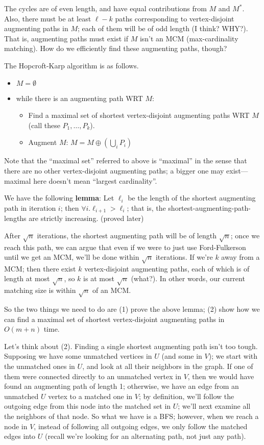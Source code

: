 \documentclass{article}
\newcommand{\bitem}{\begin{itemize}}
\newcommand{\eitem}{\end{itemize}}
\begin{document}
The cycles are of even length, and have equal contributions from $M$ and $M^*$.
Also, there must be at least $\ell-k$ paths corresponding to vertex-disjoint
augmenting paths in $M$; each of them will be of odd length (I think? WHY?).
That is, augmenting paths must exist if $M$ isn't an MCM (max-cardinality 
matching).
How do we efficiently find these augmenting paths, though? 

The Hopcroft-Karp algorithm is as follows.
\bitem
	\item
	$M = \emptyset$
	
	\item
	while there is an augmenting path WRT $M$:
		\bitem
			\item
			Find a maximal set of shortest vertex-disjoint augmenting
			paths WRT $M$ (call these $P_1, \ldots, P_k$).
			
			\item
			Augment $M$: $M = M \oplus (\bigcup_i P_i)$
		\eitem
\eitem
Note that the ``maximal set'' referred to above is ``maximal'' in the sense
that there are no other vertex-disjoint augmenting paths; a bigger one
may exist---maximal here doesn't mean ``largest cardinality''.

We have the following \textbf{lemma}:
Let $\ell_i$ be the length of the shortest augmenting path in
iteration $i$; then $\forall i. \ell_{i + 1} > \ell_i$; that is, the
shortest-augmenting-path-lengths are strictly increasing.
(proved later)

After $\sqrt n$ iterations, the shortest augmenting path will be of length 
$\sqrt n$; once we reach this path, we can argue that even if we were to
just use Ford-Fulkerson until we get an MCM, we'll be done within $\sqrt n$
iterations.
If we're $k$ away from a MCM; then there exist $k$ vertex-disjoint augmenting
paths, each of which is of length at most $\sqrt n$, so $k$ is at most
$\sqrt n$ (what?). In other words, our current matching size is within
$\sqrt n$ of an MCM.

So the two things we need to do are (1) prove the above lemma; (2) show how we 
can find a maximal set of shortest vertex-disjoint augmenting paths
in $O(m + n)$ time.

Let's think about (2).
Finding a single shortest augmenting path isn't too tough.
Supposing we have some unmatched vertices in $U$ (and some in $V$); we
start with the unmatched ones in $U$, and look at all their neighbors
in the graph.
If one of them were connected directly to an unmatched vertex in $V$, then 
we would have found an augmenting path of length 1; otherwise, we
have an edge from an unmatched $U$ vertex to a matched one in $V$; by definition,
we'll follow the outgoing edge from this node into the matched set in $U$;
we'll next examine all the neighbors of that node.
So what we have is a BFS; however, when we reach a node in $V$, instead
of following all outgoing edges, we only follow the matched edges into
$U$ (recall we're looking for an alternating path, not just any path).
\end{document}
